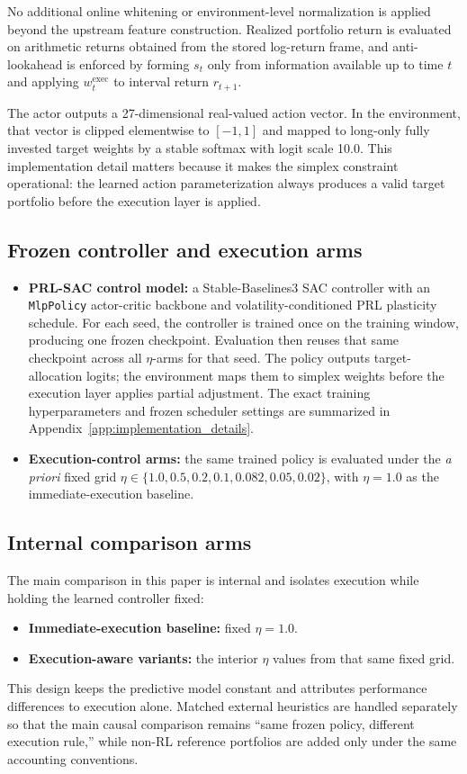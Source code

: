 \documentclass[10pt,twocolumn]{article}
\newcommand{\wexec}{w^{\mathrm{exec}}}
\begin{document}
No additional online whitening or environment-level normalization is applied beyond the upstream feature construction. Realized portfolio return is evaluated on arithmetic returns obtained from the stored log-return frame, and anti-lookahead is enforced by forming $s_t$ only from information available up to time $t$ and applying $\wexec_t$ to interval return $r_{t+1}$.

The actor outputs a 27-dimensional real-valued action vector. In the environment, that vector is clipped elementwise to $[-1,1]$ and mapped to long-only fully invested target weights by a stable softmax with logit scale 10.0. This implementation detail matters because it makes the simplex constraint operational: the learned action parameterization always produces a valid target portfolio before the execution layer is applied.

\subsection{Frozen controller and execution arms}
\begin{itemize}[leftmargin=*,itemsep=1pt]
\item \textbf{PRL-SAC control model:} a Stable-Baselines3 SAC controller with an \texttt{MlpPolicy} actor-critic backbone and volatility-conditioned PRL plasticity schedule. For each seed, the controller is trained once on the training window, producing one frozen checkpoint. Evaluation then reuses that same checkpoint across all $\eta$-arms for that seed. The policy outputs target-allocation logits; the environment maps them to simplex weights before the execution layer applies partial adjustment. The exact training hyperparameters and frozen scheduler settings are summarized in Appendix~\ref{app:implementation_details}.
\item \textbf{Execution-control arms:} the same trained policy is evaluated under the \emph{a priori} fixed grid $\eta\in\{1.0, 0.5, 0.2, 0.1, 0.082, 0.05, 0.02\}$, with $\eta=1.0$ as the immediate-execution baseline.
\end{itemize}

\subsection{Internal comparison arms}
The main comparison in this paper is internal and isolates execution while holding the learned controller fixed:
\begin{itemize}[leftmargin=*,itemsep=1pt]
\item \textbf{Immediate-execution baseline:} fixed $\eta=1.0$.
\item \textbf{Execution-aware variants:} the interior $\eta$ values from that same fixed grid.
\end{itemize}
This design keeps the predictive model constant and attributes performance differences to execution alone. Matched external heuristics are handled separately so that the main causal comparison remains ``same frozen policy, different execution rule,'' while non-RL reference portfolios are added only under the same accounting conventions.
\end{document}
